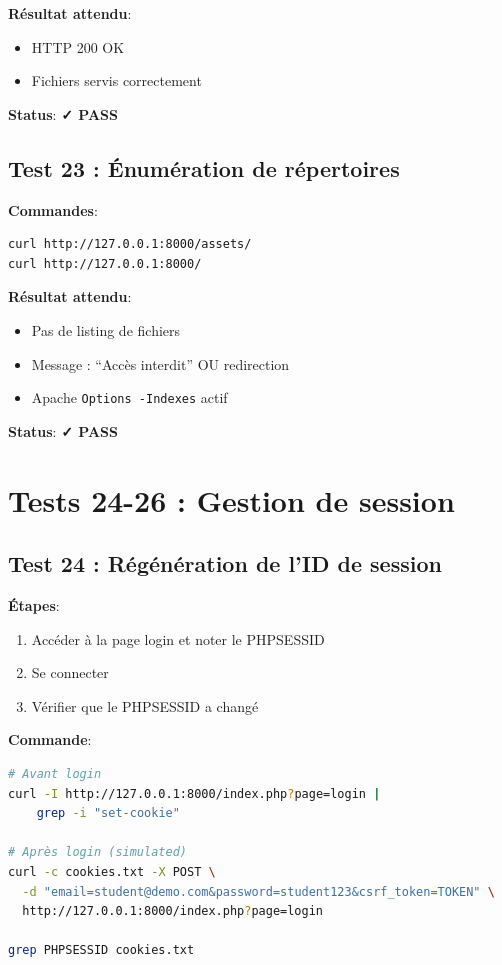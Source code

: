 \documentclass[11pt,a4paper,french]{report}
\newcommand{\pass}{\cellcolor{pass}\textbf{\color{white}✓ PASS}}
\begin{document}
\textbf{Résultat attendu}:
\begin{itemize}
    \item HTTP 200 OK
    \item Fichiers servis correctement
\end{itemize}

\textbf{Status}: \pass

\subsection{Test 23 : Énumération de répertoires}

\textbf{Commandes}:
\begin{lstlisting}[language=bash]
curl http://127.0.0.1:8000/assets/
curl http://127.0.0.1:8000/
\end{lstlisting}

\textbf{Résultat attendu}:
\begin{itemize}
    \item Pas de listing de fichiers
    \item Message : ``Accès interdit'' OU redirection
    \item Apache \texttt{Options -Indexes} actif
\end{itemize}

\textbf{Status}: \pass

\newpage

\section{Tests 24-26 : Gestion de session}

\subsection{Test 24 : Régénération de l'ID de session}

\textbf{Étapes}:
\begin{enumerate}
    \item Accéder à la page login et noter le PHPSESSID
    \item Se connecter
    \item Vérifier que le PHPSESSID a changé
\end{enumerate}

\textbf{Commande}:
\begin{lstlisting}[language=bash]
# Avant login
curl -I http://127.0.0.1:8000/index.php?page=login | 
    grep -i "set-cookie"

# Après login (simulated)
curl -c cookies.txt -X POST \
  -d "email=student@demo.com&password=student123&csrf_token=TOKEN" \
  http://127.0.0.1:8000/index.php?page=login

grep PHPSESSID cookies.txt
\end{lstlisting}
\end{document}
